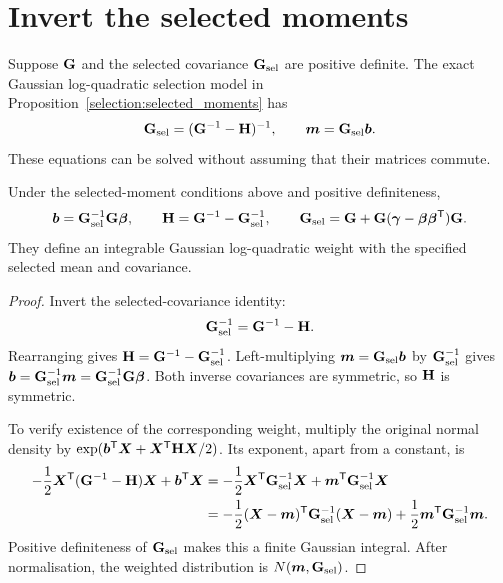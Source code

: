 \section{Invert the selected moments}
\label{conversion:inversion}

Suppose \(\mathbf{G}\) and the selected covariance \(\mathbf{G}_{\mathrm{sel}}\) are positive
definite. The exact Gaussian log-quadratic selection model in
Proposition~\ref{selection:selected_moments} has
\[
 \mathbf{G}_{\mathrm{sel}}=(\mathbf{G}^{-1}-\mathbf{H})^{-1},
 \qquad
 \boldsymbol{m}=\mathbf{G}_{\mathrm{sel}}\boldsymbol{b}.
\]
These equations can be solved without assuming that their matrices commute.

\begin{proposition}
\label{conversion:parameter_conversion}
Under the selected-moment conditions above and positive definiteness,
\begin{equation}
 \boldsymbol{b}=\mathbf{G}_{\mathrm{sel}}^{-1}\mathbf{G}\boldsymbol{\beta},\qquad
 \mathbf{H}=\mathbf{G}^{-1}-\mathbf{G}_{\mathrm{sel}}^{-1},
 \qquad
 \mathbf{G}_{\mathrm{sel}}=\mathbf{G}+\mathbf{G}
       (\boldsymbol{\gamma}-\boldsymbol{\beta}\boldsymbol{\beta}^{\mathsf T})\mathbf{G}.
 \label{conversion:conversion_formula}
\end{equation}
They define an integrable Gaussian log-quadratic weight with the specified
selected mean and covariance.
\end{proposition}

\begin{proof}
Invert the selected-covariance identity:
\[
 \mathbf{G}_{\mathrm{sel}}^{-1}=\mathbf{G}^{-1}-\mathbf{H}.
\]
Rearranging gives \(\mathbf{H}=\mathbf{G}^{-1}-\mathbf{G}_{\mathrm{sel}}^{-1}\).
Left-multiplying \(\boldsymbol{m}=\mathbf{G}_{\mathrm{sel}}\boldsymbol{b}\) by \(\mathbf{G}_{\mathrm{sel}}^{-1}\) gives
\(\boldsymbol{b}=\mathbf{G}_{\mathrm{sel}}^{-1}\boldsymbol{m}=\mathbf{G}_{\mathrm{sel}}^{-1}\mathbf{G}\boldsymbol{\beta}\).
Both inverse covariances are symmetric, so \(\mathbf{H}\) is symmetric.

To verify existence of the corresponding weight, multiply the original
normal density by \(\exp(\boldsymbol{b}^{\mathsf T}\boldsymbol{X}+
\boldsymbol{X}^{\mathsf T}\mathbf{H}\boldsymbol{X}/2)\). Its exponent, apart from a constant,
is
\begin{align*}
 -\frac12\boldsymbol{X}^{\mathsf T}(\mathbf{G}^{-1}-\mathbf{H})\boldsymbol{X}
       +\boldsymbol{b}^{\mathsf T}\boldsymbol{X}
 &=-\frac12\boldsymbol{X}^{\mathsf T}\mathbf{G}_{\mathrm{sel}}^{-1}\boldsymbol{X}
       +\boldsymbol{m}^{\mathsf T}\mathbf{G}_{\mathrm{sel}}^{-1}\boldsymbol{X}\\
 &=-\frac12(\boldsymbol{X}-\boldsymbol{m})^{\mathsf T}
          \mathbf{G}_{\mathrm{sel}}^{-1}(\boldsymbol{X}-\boldsymbol{m})
       +\frac12\boldsymbol{m}^{\mathsf T}\mathbf{G}_{\mathrm{sel}}^{-1}\boldsymbol{m}.
\end{align*}
Positive definiteness of \(\mathbf{G}_{\mathrm{sel}}\) makes this a finite Gaussian integral.
After normalisation, the weighted distribution is \(N(\boldsymbol{m},\mathbf{G}_{\mathrm{sel}})\).
\end{proof}

